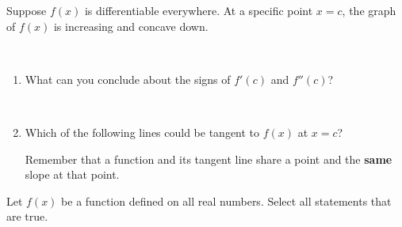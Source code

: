\documentclass{ximera}
\begin{document}
\begin{problem}
Suppose $f(x)$ is differentiable everywhere.  At a specific point $x = c$, the graph of $f(x)$ is increasing and concave down. 

~ \\[1em]

\begin{enumerate}
\item What can you conclude about the signs of $f'(c)$ and $f''(c)$?

\begin{multipleChoice}
\end{multipleChoice}

~ \\[1em]
\item Which of the following lines could be tangent to $f(x)$ at $x = c$?

\begin{multipleChoice}
\end{multipleChoice}

\begin{hint}
Remember that a function and its tangent line share a point and the \textbf{same} slope at that point.   
\end{hint}

\end{enumerate}
\end{problem}


\begin{problem}
Let $f(x)$ be a function defined on all real numbers.  Select all statements that are true.


~ \\[1em]

\begin{selectAll}
\end{selectAll}

\end{problem}
\end{document}

